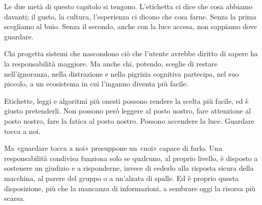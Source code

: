 Le due metà di questo capitolo si tengono. L'etichetta ci dice che cosa abbiamo davanti; il gusto, la cultura, l'esperienza ci dicono che cosa farne. Senza la prima scegliamo al buio. Senza il secondo, anche con la luce accesa, non sappiamo dove guardare.

Chi progetta sistemi che nascondono ciò che l'utente avrebbe diritto di sapere ha la responsabilità maggiore. Ma anche chi, potendo, sceglie di restare nell'ignoranza, nella distrazione e nella pigrizia cognitiva partecipa, nel suo piccolo, a un ecosistema in cui l'inganno diventa più facile.

Etichette, leggi e algoritmi più onesti possono rendere la scelta più facile, ed è giusto pretenderli. Non possono però leggere al posto nostro, fare attenzione al posto nostro, fare la fatica al posto nostro. Possono accendere la luce. Guardare tocca a noi.

Ma «guardare tocca a noi» presuppone un «noi» capace di farlo. Una responsabilità condivisa funziona solo se qualcuno, al proprio livello, è disposto a sostenere un giudizio e a risponderne, invece di cederlo alla risposta sicura della macchina, al parere del gruppo o a un'alzata di spalle. Ed è proprio questa disposizione, più che la mancanza di informazioni, a sembrare oggi la risorsa più scarsa.

